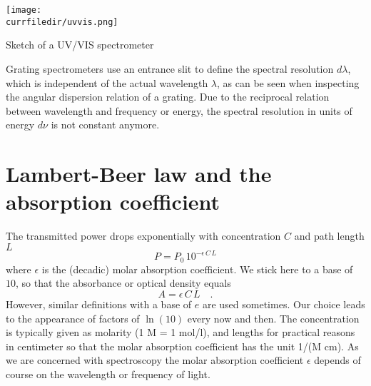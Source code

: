\begin{marginfigure}
\texttt{[image: \\currfiledir/uvvis.png]}
\caption{Sketch of a UV/VIS spectrometer}
\end{marginfigure}



Grating spectrometers use an entrance slit to define the spectral resolution $d \lambda$, which is independent of the actual wavelength $\lambda$, as can be seen when inspecting the   angular dispersion relation of a grating. Due to the reciprocal relation between wavelength and frequency or energy, the spectral resolution in units of energy $d \nu$ is not constant anymore.


%
%


\section{Lambert-Beer law and the absorption coefficient}

The transmitted power drops exponentially with  concentration $C$ and  path length $L$
\[
 P = P_0 \, 10^{- \epsilon\, C \, L}
\]
where $\epsilon$ is the (decadic) molar absorption coefficient. We stick here to a base of $10$, 
so that the absorbance or optical density equals 
\[
 A = \epsilon\, C \, L \quad.
\]
However, similar definitions with a base of $e$ are used sometimes. Our choice leads to the appearance of factors of $\ln(10)$ every now and then. The concentration is typically given as molarity (1 M = 1 mol/l), and lengths for practical reasons in centimeter
so that the molar absorption coefficient has the unit 1/(M  cm). As we are concerned with spectroscopy the molar absorption coefficient $\epsilon$ depends of course on the wavelength or frequency of light.

